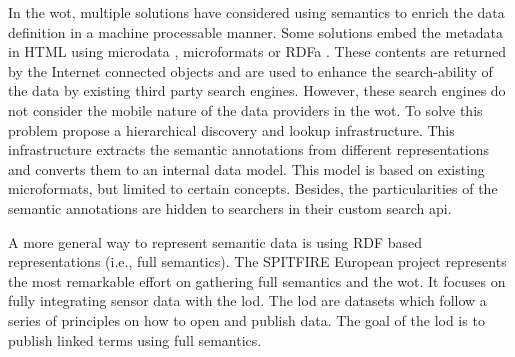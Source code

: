 In the \acl{wot}, multiple solutions have considered using semantics to enrich the data definition in a machine processable manner.
Some solutions embed the metadata in HTML using microdata , microformats  or RDFa .
These contents are returned by the Internet connected objects and are used to enhance the search-ability of the data by existing third party search engines.
However, these search engines do not consider the mobile nature of the data providers in the \ac{wot}. %
To solve this problem \citet{trifa_leveraging_2011} propose a hierarchical discovery and lookup infrastructure.
This infrastructure extracts the semantic annotations from different representations and converts them to an internal data model.
This model is based on existing microformats, but limited to certain concepts.
Besides, the particularities of the semantic annotations are hidden to searchers in their custom search \acs{api}. %


A more general way to represent semantic data is using RDF  based representations (i.e., full semantics). %
The SPITFIRE European project  represents the most remarkable effort on gathering full semantics and the \ac{wot}.
It focuses on fully integrating sensor data with the \ac{lod}. 
The \ac{lod} are datasets which follow a series of principles on how to open and publish data.
The goal of the \ac{lod} is to publish linked terms using full semantics.


